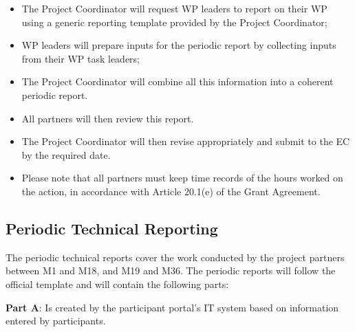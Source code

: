\documentclass[
]{article}
\providecommand{\tightlist}{%
  \setlength{\itemsep}{0pt}\setlength{\parskip}{0pt}}
\begin{document}
\begin{itemize}
\tightlist
\item
  The Project Coordinator will request WP leaders to report on their WP using a generic reporting template provided by the Project Coordinator;\\
\item
  WP leaders will prepare inputs for the periodic report by collecting inputs from their WP task leaders;\\
\item
  The Project Coordinator will combine all this information into a coherent periodic report.\\
\item
  All partners will then review this report.\\
\item
  The Project Coordinator will then revise appropriately and submit to the EC by the required date.\\
\item
  Please note that all partners must keep time records of the hours worked on the action, in accordance with Article 20.1(e) of the Grant Agreement.
\end{itemize}

\hypertarget{periodic-technical-reporting}{%
\subsection{Periodic Technical Reporting}\label{periodic-technical-reporting}}

The periodic technical reports cover the work conducted by the project partners between M1 and M18, and M19 and M36. The periodic reports will follow the official template and will contain the following parts:

\textbf{Part A}: Is created by the participant portal's IT system based on information entered by participants.
\end{document}
